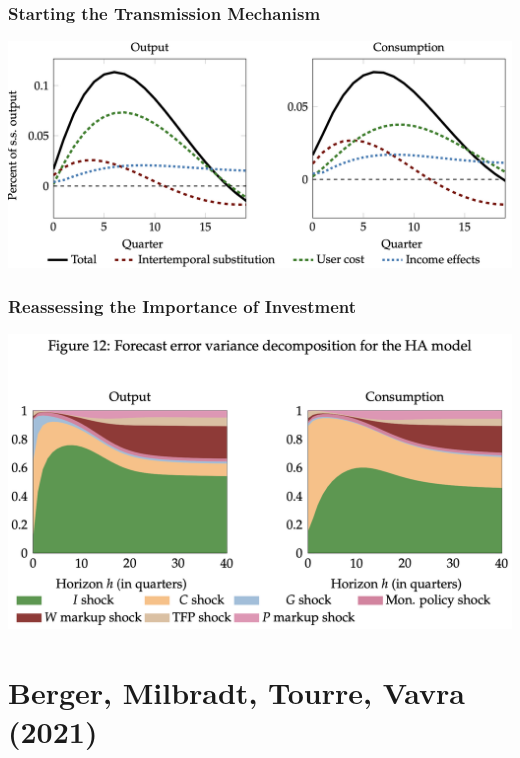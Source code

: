 \documentclass[english,xcolor=svgnames]{beamer}
\begin{document}
\begin{frame}
    \frametitle{Starting the Transmission Mechanism}
    \begin{center}
    	\includegraphics[scale=0.3]{figures/ARSFIG8.png}	
    \end{center}
\end{frame}


\begin{frame}
    \frametitle{Reassessing the Importance of Investment}
    \begin{center}
    	\includegraphics[scale=0.3]{figures/ARSFIG12.png}	
    \end{center}
\end{frame}




\section{Berger, Milbradt, Tourre, Vavra (2021)}
\end{document}
